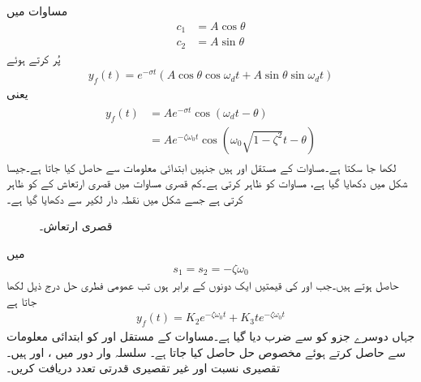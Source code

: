 مساوات  میں
\begin{align*}
c_1&=A \cos \theta\\
c_2&=A\sin \theta
\end{align*}
پُر کرتے ہوئے
\begin{align*}
y_f(t)=e^{-\sigma t} \left(A \cos \theta \cos \omega_d t +A \sin \theta \sin \omega_d t\right)
\end{align*}
یعنی
\begin{gather}
\begin{aligned}\label{مساوات_عارضی_فطری_حل_کم_تقصیر_ب}
y_f(t)&=Ae^{-\sigma t} \cos(\omega_d t -\theta)\\
&=Ae^{-\zeta \omega_0 t} \cos(\omega_0 \sqrt{1-\zeta^2} t-\theta)
\end{aligned}
\end{gather}
لکھا جا سکتا ہے۔مساوات  کے مستقل  اور  ہیں جنہیں ابتدائی معلومات سے حاصل کیا جاتا ہے۔جیسا شکل  میں دکھایا گیا ہے، مساوات    کو ظاہر کرتی ہے۔کم قصری مساوات میں  قصری ارتعاش کے  کو ظاہر کرتی ہے جسے شکل میں نقطہ دار لکیر سے  دکھایا گیا ہے۔
\begin{figure}
\centering
\pgfplotsset{scaled x ticks=false,scaled y ticks=false}
%
\caption{قصری ارتعاش۔}
\label{شکل_عارضی_کم_قصری_فطری_حل}
\end{figure}
  میں
\begin{align}
s_1=s_2=-\zeta \omega_0
\end{align}
حاصل ہوتے ہیں۔جب  اور  کی قیمتیں ایک دونوں کے برابر  ہوں تب عمومی فطری حل درج ذیل لکھا جاتا ہے
\begin{align}\label{مساوات_عارضی_فطری_فاصل_مقصور_حل}
y_f(t)=K_2 e^{-\zeta \omega_0 t}+K_3 t e^{-\zeta \omega_0 t}
\end{align}
جہاں دوسرے جزو کو  سے ضرب دیا گیا ہے۔مساوات کے مستقل  اور  کو ابتدائی معلومات سے حاصل کرتے ہوئے مخصوص حل حاصل کیا جاتا ہے۔
سلسلہ وار  دور میں ،  اور  ہیں۔تقصیری نسبت اور غیر تقصیری قدرتی تعدد دریافت کریں۔

